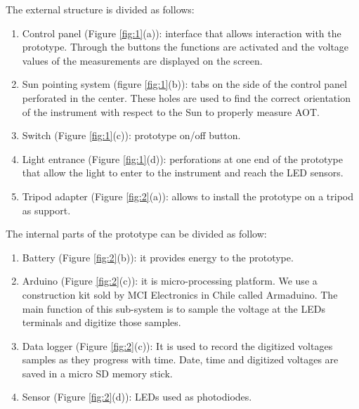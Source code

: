 \documentclass[12pt,letterpaper]{article}
\numberwithin{figure}{section}
\numberwithin{equation}{section}
\numberwithin{table}{section}
\begin{document}
The external structure is divided as follows:

\begin{enumerate}
    \item Control panel (Figure \ref{fig:1}(a)): interface that allows interaction with the prototype. Through the buttons the functions are activated and the voltage values of the measurements are displayed on the screen.
     \item Sun pointing system (figure \ref{fig:1}(b)): tabs on the side of the control panel perforated in the center. These holes are used to find the correct orientation of the instrument with respect to the Sun to properly measure AOT.
     \item Switch (Figure \ref{fig:1}(c)): prototype on/off button.
     \item Light entrance (Figure \ref{fig:1}(d)): perforations at one end of the prototype that allow the light to enter to the instrument and reach the LED sensors.
     \item Tripod adapter (Figure \ref{fig:2}(a)): allows to install the prototype on a tripod as support.
\end{enumerate}

The internal parts of the prototype can be divided as follow:

\begin{enumerate}
     \item Battery (Figure \ref{fig:2}(b)): it provides energy to the prototype.
     \item Arduino (Figure \ref{fig:2}(c)): it is micro-processing platform. We use a construction kit sold by MCI Electronics in Chile called Armaduino. The main function of this sub-system is to sample the voltage at the LEDs terminals and digitize those samples.   
     \item Data logger (Figure \ref{fig:2}(c)): It is used to record the digitized voltages samples as they progress with time. Date, time and digitized voltages are saved in a micro SD memory stick.
     \item Sensor (Figure \ref{fig:2}(d)): LEDs used as photodiodes.
\end{enumerate}
\end{document}
